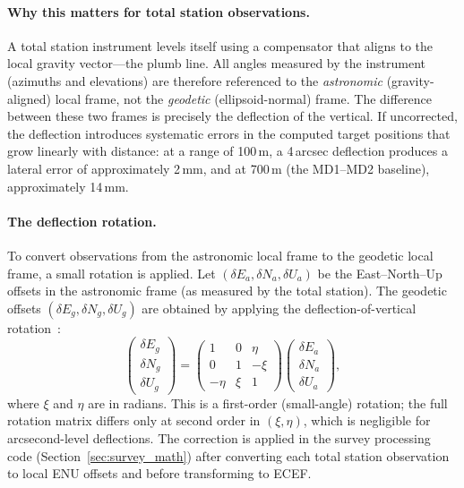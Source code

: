 \paragraph{Why this matters for total station observations.} A total station instrument levels itself using a compensator that aligns to the local gravity vector---the plumb line. All angles measured by the instrument (azimuths and elevations) are therefore referenced to the \emph{astronomic} (gravity-aligned) local frame, not the \emph{geodetic} (ellipsoid-normal) frame. The difference between these two frames is precisely the deflection of the vertical. If uncorrected, the deflection introduces systematic errors in the computed target positions that grow linearly with distance: at a range of 100\,m, a 4\,arcsec deflection produces a lateral error of approximately 2\,mm, and at 700\,m (the MD1--MD2 baseline), approximately 14\,mm.

\paragraph{The deflection rotation.} To convert observations from the astronomic local frame to the geodetic local frame, a small rotation is applied. Let $(\delta E_a, \delta N_a, \delta U_a)$ be the East--North--Up offsets in the astronomic frame (as measured by the total station). The geodetic offsets $(\delta E_g, \delta N_g, \delta U_g)$ are obtained by applying the deflection-of-vertical rotation~\cite{torge2012}:
\begin{equation}
\begin{pmatrix} \delta E_g \\ \delta N_g \\ \delta U_g \end{pmatrix}
=
\begin{pmatrix}
1 & 0 & \eta \\
0 & 1 & -\xi \\
-\eta & \xi & 1
\end{pmatrix}
\begin{pmatrix} \delta E_a \\ \delta N_a \\ \delta U_a \end{pmatrix},
\label{eq:deflection_rotation}
\end{equation}
where $\xi$ and $\eta$ are in radians. This is a first-order (small-angle) rotation; the full rotation matrix differs only at second order in $(\xi, \eta)$, which is negligible for arcsecond-level deflections. The correction is applied in the survey processing code (Section~\ref{sec:survey_math}) after converting each total station observation to local ENU offsets and before transforming to ECEF.

